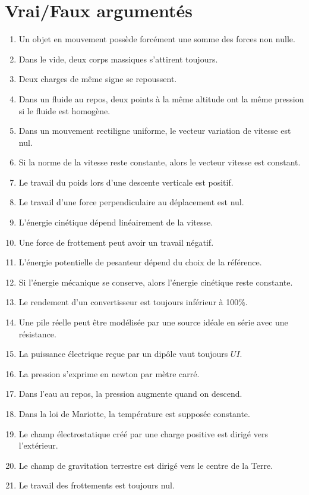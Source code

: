 \documentclass[11pt,a4paper]{article}
\begin{document}
\section{Vrai/Faux argumentés}
\begin{enumerate}[label=\textbf{VF \arabic*.},leftmargin=*]
\item Un objet en mouvement possède forcément une somme des forces non nulle.
\item Dans le vide, deux corps massiques s'attirent toujours.
\item Deux charges de même signe se repoussent.
\item Dans un fluide au repos, deux points à la même altitude ont la même pression si le fluide est homogène.
\item Dans un mouvement rectiligne uniforme, le vecteur variation de vitesse est nul.
\item Si la norme de la vitesse reste constante, alors le vecteur vitesse est constant.
\item Le travail du poids lors d'une descente verticale est positif.
\item Le travail d'une force perpendiculaire au déplacement est nul.
\item L'énergie cinétique dépend linéairement de la vitesse.
\item Une force de frottement peut avoir un travail négatif.
\item L'énergie potentielle de pesanteur dépend du choix de la référence.
\item Si l'énergie mécanique se conserve, alors l'énergie cinétique reste constante.
\item Le rendement d'un convertisseur est toujours inférieur à 100\%.
\item Une pile réelle peut être modélisée par une source idéale en série avec une résistance.
\item La puissance électrique reçue par un dipôle vaut toujours $UI$.
\item La pression s'exprime en newton par mètre carré.
\item Dans l'eau au repos, la pression augmente quand on descend.
\item Dans la loi de Mariotte, la température est supposée constante.
\item Le champ électrostatique créé par une charge positive est dirigé vers l'extérieur.
\item Le champ de gravitation terrestre est dirigé vers le centre de la Terre.
\item Le travail des frottements est toujours nul.

\end{enumerate}
\end{document}
